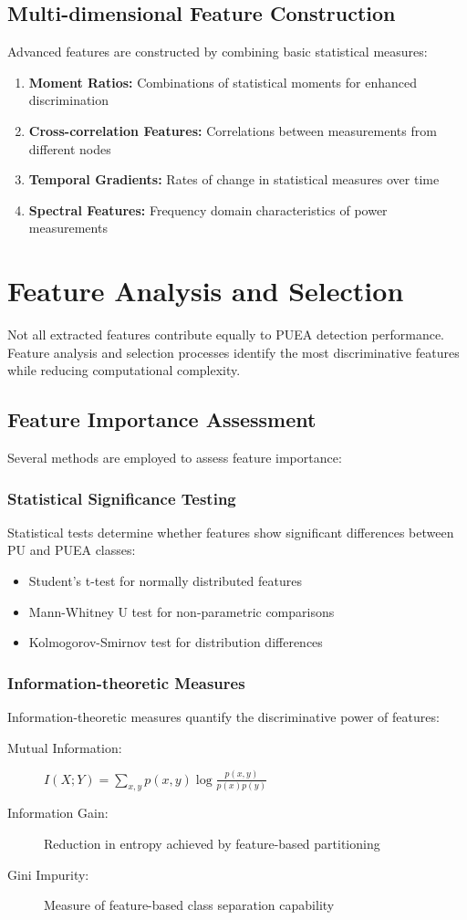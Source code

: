 \subsection{Multi-dimensional Feature Construction}
Advanced features are constructed by combining basic statistical measures:

\begin{enumerate}
\item \textbf{Moment Ratios:} Combinations of statistical moments for enhanced discrimination
\item \textbf{Cross-correlation Features:} Correlations between measurements from different nodes
\item \textbf{Temporal Gradients:} Rates of change in statistical measures over time
\item \textbf{Spectral Features:} Frequency domain characteristics of power measurements
\end{enumerate}

\section{Feature Analysis and Selection}
Not all extracted features contribute equally to PUEA detection performance. Feature analysis and selection processes identify the most discriminative features while reducing computational complexity.

\subsection{Feature Importance Assessment}
Several methods are employed to assess feature importance:

\subsubsection{Statistical Significance Testing}
Statistical tests determine whether features show significant differences between PU and PUEA classes:
\begin{itemize}
\item Student's t-test for normally distributed features
\item Mann-Whitney U test for non-parametric comparisons
\item Kolmogorov-Smirnov test for distribution differences
\end{itemize}

\subsubsection{Information-theoretic Measures}
Information-theoretic measures quantify the discriminative power of features:
\begin{description}
\item[Mutual Information:] $I(X;Y) = \sum_{x,y} p(x,y) \log \frac{p(x,y)}{p(x)p(y)}$
\item[Information Gain:] Reduction in entropy achieved by feature-based partitioning
\item[Gini Impurity:] Measure of feature-based class separation capability
\end{description}

